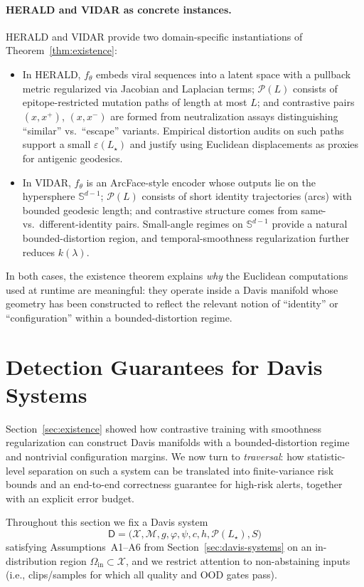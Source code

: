 \documentclass[11pt]{article}
\theoremstyle{remark}
\theoremstyle{plain}
\begin{document}
\paragraph{HERALD and VIDAR as concrete instances.}
HERALD and VIDAR provide two domain-specific instantiations of Theorem~\ref{thm:existence}:
\begin{itemize}
  \item In HERALD, $f_\theta$ embeds viral sequences into a latent space with a pullback metric
    regularized via Jacobian and Laplacian terms; $\mathcal{P}(L)$ consists of epitope-restricted
    mutation paths of length at most $L$; and contrastive pairs $(x,x^+)$, $(x,x^-)$ are formed
    from neutralization assays distinguishing ``similar'' vs.\ ``escape'' variants. Empirical
    distortion audits on such paths support a small $\varepsilon(L_\star)$ and justify using
    Euclidean displacements as proxies for antigenic geodesics.
  \item In VIDAR, $f_\theta$ is an ArcFace-style encoder whose outputs lie on the hypersphere
    $\mathbb{S}^{d-1}$; $\mathcal{P}(L)$ consists of short identity trajectories (arcs) with bounded
    geodesic length; and contrastive structure comes from same- vs.\ different-identity pairs.
    Small-angle regimes on $\mathbb{S}^{d-1}$ provide a natural bounded-distortion region, and
    temporal-smoothness regularization further reduces $k(\lambda)$.
\end{itemize}
In both cases, the existence theorem explains \emph{why} the Euclidean computations used at
runtime are meaningful: they operate inside a Davis manifold whose geometry has been constructed
to reflect the relevant notion of ``identity'' or ``configuration'' within a bounded-distortion regime.
\section{Detection Guarantees for Davis Systems}
\label{sec:theory2}

Section~\ref{sec:existence} showed how contrastive training with smoothness regularization can
construct Davis manifolds with a bounded-distortion regime and nontrivial configuration margins.
We now turn to \emph{traversal}: how statistic-level separation on such a system can be translated
into finite-variance risk bounds and an end-to-end correctness guarantee for high-risk alerts,
together with an explicit error budget.

Throughout this section we fix a Davis system
\[
\mathsf{D} = \bigl( \mathcal{X}, \mathcal{M}, g, \varphi, \psi, c, h, \mathcal{P}(L_\star), S \bigr)
\]
satisfying Assumptions~A1–A6 from Section~\ref{sec:davis-systems} on an in-distribution region
$\Omega_{\mathrm{in}} \subset \mathcal{X}$, and we restrict attention to non-abstaining inputs
(i.e., clips/samples for which all quality and OOD gates pass).
\end{document}
